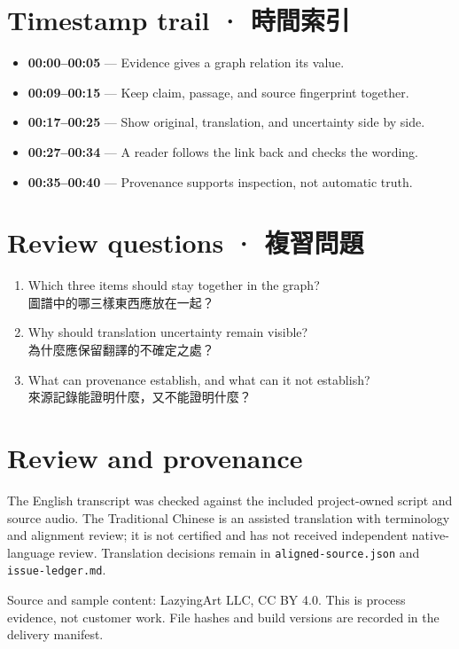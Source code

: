 \documentclass[10pt]{article}
\begin{document}
\newpage
\section*{Timestamp trail · 時間索引}
\begin{itemize}
  \item \textbf{00:00--00:05} — Evidence gives a graph relation its value.
  \item \textbf{00:09--00:15} — Keep claim, passage, and source fingerprint together.
  \item \textbf{00:17--00:25} — Show original, translation, and uncertainty side by side.
  \item \textbf{00:27--00:34} — A reader follows the link back and checks the wording.
  \item \textbf{00:35--00:40} — Provenance supports inspection, not automatic truth.
\end{itemize}

\section*{Review questions · 複習問題}
\begin{enumerate}
  \item Which three items should stay together in the graph?\\
  圖譜中的哪三樣東西應放在一起？
  \item Why should translation uncertainty remain visible?\\
  為什麼應保留翻譯的不確定之處？
  \item What can provenance establish, and what can it not establish?\\
  來源記錄能證明什麼，又不能證明什麼？
\end{enumerate}

\section*{Review and provenance}
\small
The English transcript was checked against the included project-owned script and source audio. The Traditional Chinese is an assisted translation with terminology and alignment review; it is not certified and has not received independent native-language review. Translation decisions remain in \texttt{aligned-source.json} and \texttt{issue-ledger.md}.

Source and sample content: LazyingArt LLC, CC BY 4.0. This is process evidence, not customer work. File hashes and build versions are recorded in the delivery manifest.
\end{document}
